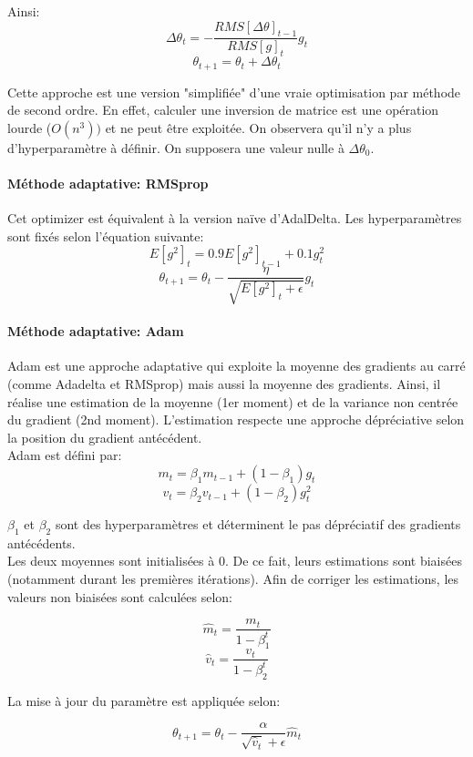 \noindent Ainsi:
$$\Delta \theta_t =  -\dfrac{RMS[\Delta \theta]_{t-1}}{RMS[g]_{t}} g_{t}$$
$$\theta_{t+1} = \theta_t + \Delta \theta_t $$

\noindent Cette approche est une version "simplifiée" d'une vraie optimisation par méthode de second ordre. En effet, calculer une inversion de matrice est une opération lourde ($O(n^3))$ et ne peut être exploitée. On observera qu'il n'y a plus d'hyperparamètre à définir. On supposera une valeur nulle à $\Delta \theta_0$. \\

\paragraph{Méthode adaptative: RMSprop}
\noindent Cet optimizer est équivalent à la version naïve d'AdalDelta. Les hyperparamètres sont fixés selon l'équation suivante:
$$E[g^2]_t = 0.9 E[g^2]_{t-1} + 0.1 g^2_t$$
$$\theta_{t+1} = \theta_{t} - \dfrac{\eta}{\sqrt{E[g^2]_t + \epsilon}} g_{t} $$

\paragraph{Méthode adaptative: Adam}
Adam\cite{adam_and_max} est une approche adaptative qui exploite la moyenne des gradients au carré (comme Adadelta et RMSprop) mais aussi la moyenne des gradients. Ainsi, il réalise une estimation de la moyenne (1er moment) et de la variance non centrée du gradient (2nd moment). L'estimation respecte une approche dépréciative selon la position du gradient antécédent.\\

\noindent Adam est défini par:
$$m_t = \beta_1 m_{t-1} + (1 - \beta_1) g_t$$
$$v_t = \beta_2 v_{t-1} + (1 - \beta_2) g_t^2 $$

\noindent $\beta_1$ et $\beta_2$ sont des hyperparamètres et déterminent le pas dépréciatif des gradients antécédents.\\

\noindent Les deux moyennes sont initialisées à 0. De ce fait, leurs estimations sont biaisées (notamment durant les premières itérations). Afin de corriger les estimations, les valeurs non biaisées sont calculées selon:

$$\hat{m}_t = \dfrac{m_t}{1 - \beta^t_1}$$
$$\hat{v}_t = \dfrac{v_t}{1 - \beta^t_2}$$

\noindent La mise à jour du paramètre est appliquée selon:

$$\theta_{t+1} = \theta_{t} - \dfrac{\alpha}{\sqrt{\hat{v}_t} + \epsilon} \hat{m}_t$$

